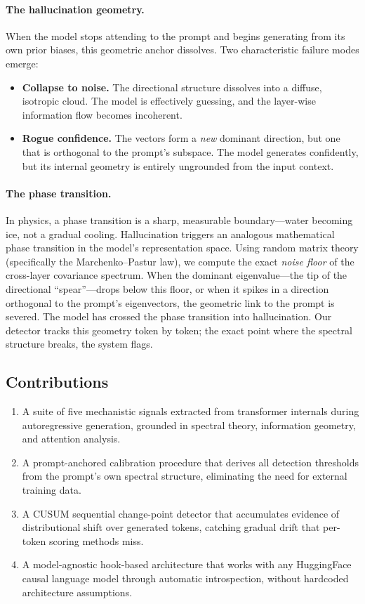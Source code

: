 \documentclass{article}
\begin{document}
\paragraph{The hallucination geometry.}
When the model stops attending to the prompt and begins generating from its own prior biases, this geometric anchor dissolves. Two characteristic failure modes emerge:
\begin{itemize}
    \item \textbf{Collapse to noise.} The directional structure dissolves into a diffuse, isotropic cloud. The model is effectively guessing, and the layer-wise information flow becomes incoherent.
    \item \textbf{Rogue confidence.} The vectors form a \emph{new} dominant direction, but one that is orthogonal to the prompt's subspace. The model generates confidently, but its internal geometry is entirely ungrounded from the input context.
\end{itemize}

\paragraph{The phase transition.}
In physics, a phase transition is a sharp, measurable boundary---water becoming ice, not a gradual cooling. Hallucination triggers an analogous mathematical phase transition in the model's representation space. Using random matrix theory (specifically the Marchenko--Pastur law), we compute the exact \emph{noise floor} of the cross-layer covariance spectrum. When the dominant eigenvalue---the tip of the directional ``spear''---drops below this floor, or when it spikes in a direction orthogonal to the prompt's eigenvectors, the geometric link to the prompt is severed. The model has crossed the phase transition into hallucination. Our detector tracks this geometry token by token; the exact point where the spectral structure breaks, the system flags.

\subsection{Contributions}

\begin{enumerate}
    \item A suite of five mechanistic signals extracted from transformer internals during autoregressive generation, grounded in spectral theory, information geometry, and attention analysis.
    \item A prompt-anchored calibration procedure that derives all detection thresholds from the prompt's own spectral structure, eliminating the need for external training data.
    \item A CUSUM sequential change-point detector that accumulates evidence of distributional shift over generated tokens, catching gradual drift that per-token scoring methods miss.
    \item A model-agnostic hook-based architecture that works with any HuggingFace causal language model through automatic introspection, without hardcoded architecture assumptions.
\end{enumerate}
\end{document}
